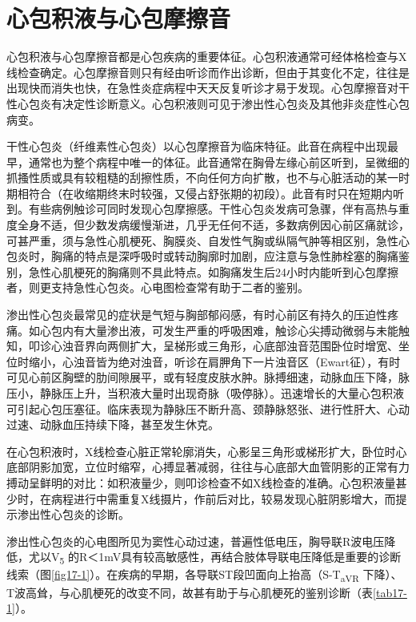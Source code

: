 \chapter{心包积液与心包摩擦音}

心包积液与心包摩擦音都是心包疾病的重要体征。心包积液通常可经体格检查与X线检查确定。心包摩擦音则只有经由听诊而作出诊断，但由于其变化不定，往往是出现快而消失也快，在急性炎症病程中天天反复听诊才易于发现。心包摩擦音对干性心包炎有决定性诊断意义。心包积液则可见于渗出性心包炎及其他非炎症性心包病变。

干性心包炎（纤维素性心包炎）以心包摩擦音为临床特征。此音在病程中出现最早，通常也为整个病程中唯一的体征。此音通常在胸骨左缘心前区听到，呈微细的抓搔性质或具有较粗糙的刮擦性质，不向任何方向扩散，也不与心脏活动的某一时期相符合（在收缩期终末时较强，又侵占舒张期的初段）。此音有时只在短期内听到。有些病例触诊可同时发现心包摩擦感。干性心包炎发病可急骤，伴有高热与重度全身不适，但少数发病缓慢渐进，几乎无任何不适，多数病例因心前区痛就诊，可甚严重，须与急性心肌梗死、胸膜炎、自发性气胸或纵隔气肿等相区别，急性心包炎时，胸痛的特点是深呼吸时或转动胸廓时加剧，应注意与急性肺栓塞的胸痛鉴别，急性心肌梗死的胸痛则不具此特点。如胸痛发生后24小时内能听到心包摩擦者，则更支持急性心包炎。心电图检查常有助于二者的鉴别。

渗出性心包炎最常见的症状是气短与胸部郁闷感，有时心前区有持久的压迫性疼痛。如心包内有大量渗出液，可发生严重的呼吸困难，触诊心尖搏动微弱与未能触知，叩诊心浊音界向两侧扩大，呈梯形或三角形，心底部浊音范围卧位时增宽、坐位时缩小，心浊音皆为绝对浊音，听诊在肩胛角下一片浊音区（Ewart征），有时可见心前区胸壁的肋间隙展平，或有轻度皮肤水肿。脉搏细速，动脉血压下降，脉压小，静脉压上升，当积液大量时出现奇脉（吸停脉）。迅速增长的大量心包积液可引起心包压塞征。临床表现为静脉压不断升高、颈静脉怒张、进行性肝大、心动过速、动脉血压持续下降，甚至发生休克。

在心包积液时，X线检查心脏正常轮廓消失，心影呈三角形或梯形扩大，卧位时心底部阴影加宽，立位时缩窄，心搏显著减弱，往往与心底部大血管阴影的正常有力搏动呈鲜明的对比：如积液量少，则叩诊检查不如X线检查的准确。心包积液量甚少时，在病程进行中需重复X线摄片，作前后对比，较易发现心脏阴影增大，而提示渗出性心包炎的诊断。

渗出性心包炎的心电图所见为窦性心动过速，普遍性低电压，胸导联R波电压降低，尤以V\textsubscript{5}
的R＜1mV具有较高敏感性，再结合肢体导联电压降低是重要的诊断线索（图\ref{fig17-1}）。在疾病的早期，各导联ST段凹面向上抬高（S-T\textsubscript{aVR}
下降）、T波高耸，与心肌梗死的改变不同，故甚有助于与心肌梗死的鉴别诊断（表\ref{tab17-1}）。

